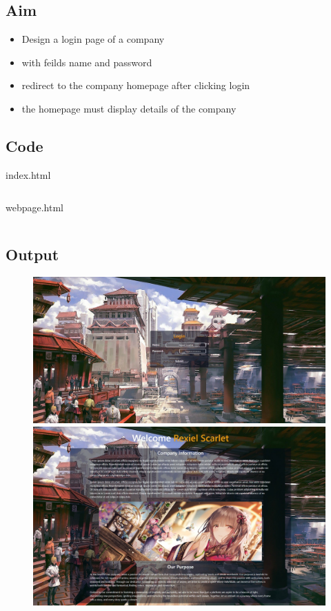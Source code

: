 \documentclass{article}
\begin{document}
\subsection{Aim}
\begin{itemize}
  \item Design a login page of a  company
  \item with feilds name and password
  \item redirect to the company homepage after clicking login
  \item the homepage must display details of the company
\end{itemize}

\subsection{Code}
index.html
\inputminted[frame=lines, breaklines, breakanywhere, numberblanklines=false]{html}{./prog_16/index.html}
webpage.html
\inputminted[frame=lines, breaklines, numberblanklines=false]{html}{./prog_16/webpage.html}

\newpage
\subsection{Output}
\begin{figure}[h!]
	\centering
	\includegraphics[width=1\textwidth]{./Assets/p1601.jpeg}
	\includegraphics[width=1\textwidth]{./Assets/p1602.jpeg}
\end{figure}
\newpage
\end{document}
